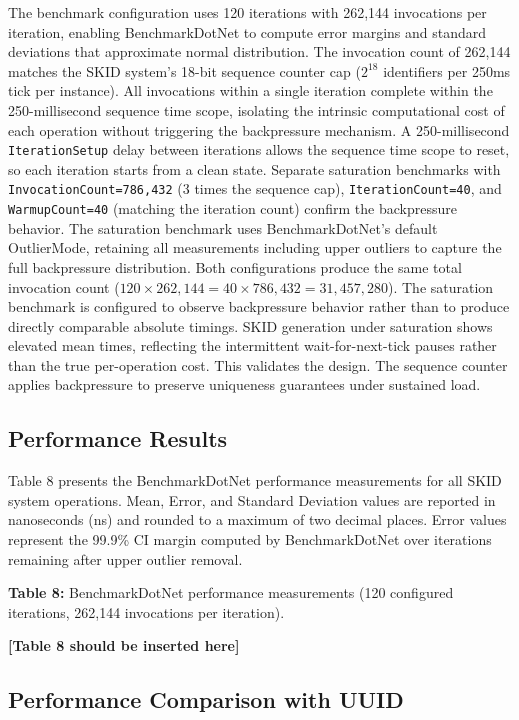 \documentclass[fleqn,10pt,lineno]{wlpeerj}
\begin{document}
The benchmark configuration uses 120 iterations with 262,144 invocations
per iteration, enabling BenchmarkDotNet to compute error margins and
standard deviations that approximate normal distribution. The invocation
count of 262,144 matches the SKID system's 18-bit sequence counter cap
(\(2^{18}\) identifiers per 250ms tick per instance). All invocations
within a single iteration complete within the 250-millisecond sequence
time scope, isolating the intrinsic computational cost of each operation
without triggering the backpressure mechanism. A 250-millisecond
\texttt{IterationSetup} delay between iterations allows the sequence
time scope to reset, so each iteration starts from a clean state.
Separate saturation benchmarks with \texttt{InvocationCount=786,432} (3
times the sequence cap), \texttt{IterationCount=40}, and
\texttt{WarmupCount=40} (matching the iteration count) confirm the
backpressure behavior. The saturation benchmark uses BenchmarkDotNet's
default OutlierMode, retaining all measurements including upper outliers
to capture the full backpressure distribution. Both configurations
produce the same total invocation count
(\(120 \times 262{,}144 = 40 \times 786{,}432 = 31{,}457{,}280\)). The
saturation benchmark is configured to observe backpressure behavior
rather than to produce directly comparable absolute timings. SKID
generation under saturation shows elevated mean times, reflecting the
intermittent wait-for-next-tick pauses rather than the true
per-operation cost. This validates the design. The sequence counter
applies backpressure to preserve uniqueness guarantees under sustained
load.

\subsection{Performance Results}\label{performance-results}

Table 8 presents the BenchmarkDotNet performance measurements for all
SKID system operations. Mean, Error, and Standard Deviation values are
reported in nanoseconds (ns) and rounded to a maximum of two decimal
places. Error values represent the 99.9\% CI margin computed by
BenchmarkDotNet over iterations remaining after upper outlier removal.

\textbf{Table 8:} BenchmarkDotNet performance measurements (120
configured iterations, 262,144 invocations per iteration).

\textbf{{[}Table 8 should be inserted here{]}}

\subsection{Performance Comparison with
UUID}\label{performance-comparison-with-uuid}
\end{document}
